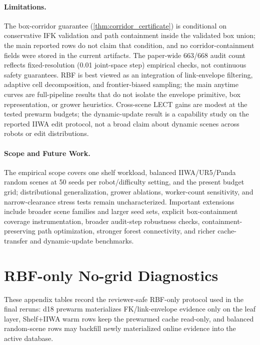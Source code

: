 \documentclass[journal]{IEEEtran}
\DeclareRobustCommand{\textsc}[1]{\textnormal{\MakeUppercase{#1}}}
\newcommand{\rbf}{\textsc{RBF}}
\begin{document}
\paragraph{Limitations.}
The box-corridor guarantee (\cref{thm:corridor_certificate}) is conditional on
conservative IFK validation and path containment inside the validated box union;
the main reported rows do not claim that condition, and no
corridor-containment fields were stored in the current artifacts. The
paper-wide 663/668 audit count reflects fixed-resolution (0.01 joint-space
step) empirical checks, not continuous safety guarantees. \rbf{} is best
viewed as an integration of link-envelope filtering, adaptive cell
decomposition, and frontier-biased sampling; the main anytime curves are
full-pipeline results that do not isolate the envelope primitive, box
representation, or grower heuristics. Cross-scene LECT gains are modest at the
tested prewarm budgets; the dynamic-update result is a capability study on the
reported IIWA edit protocol, not a broad claim about dynamic scenes across
robots or edit distributions.

\paragraph{Scope and Future Work.}
The empirical scope covers one shelf workload, balanced IIWA/UR5/Panda random
scenes at 50 seeds per robot/difficulty setting, and the present budget grid;
distributional generalization, grower ablations, worker-count sensitivity, and
narrow-clearance stress tests remain uncharacterized. Important extensions
include broader scene families and larger seed sets, explicit box-containment
coverage instrumentation, broader audit-step robustness checks,
containment-preserving path optimization, stronger forest connectivity, and
richer cache-transfer and dynamic-update benchmarks.

\appendices

\section{RBF-only No-grid Diagnostics}\label{app:rbf_only_nogrid}

These appendix tables record the reviewer-safe RBF-only protocol used in the
final reruns: d18 prewarm materializes FK/link-envelope evidence only on the
leaf layer, Shelf+IIWA warm rows keep the prewarmed cache read-only, and
balanced random-scene rows may backfill newly materialized online evidence into
the active database.






\end{document}
